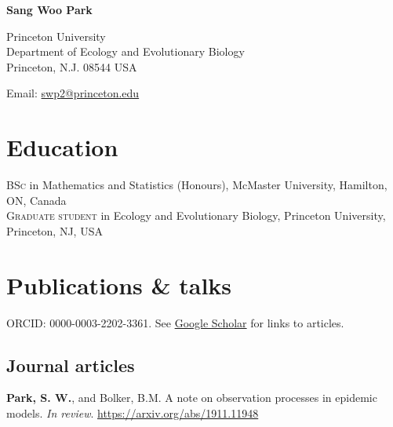 \documentclass[11pt]{article} %
\begin{document}

{\LARGE\bfseries Sang Woo Park} %
\bigskip\bigskip\medskip %

Princeton University\\ %
Department of Ecology and Evolutionary Biology\\
Princeton, N.J. 08544 USA
\medskip %

Email: \href{mailto:swp2@princeton.edu}{swp2@princeton.edu}\\ %


\section*{Education}

\textsc{BSc} in Mathematics and Statistics (Honours), McMaster University, Hamilton, ON, Canada\\
\textsc{Graduate student} in Ecology and Evolutionary Biology, Princeton University, Princeton, NJ, USA\\


\section*{Publications \& talks}

ORCID: 0000-0003-2202-3361. See \href{https://scholar.google.com/citations?user=ZSCrs78AAAAJ&hl=en&oi=ao}{Google Scholar} for links to articles.

\subsection*{Journal articles}

 \textbf{Park, S. W.}, and Bolker, B.M. A note on observation processes in epidemic models. \textit{In review}. \href{https://arxiv.org/abs/1911.11948}{https://arxiv.org/abs/1911.11948}
\end{document}
